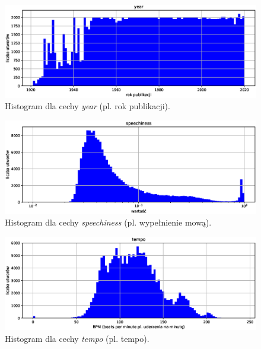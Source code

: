 \documentclass[a4paper,12pt]{article}
\numberwithin{figure}{section}
\begin{document}
    \smallskip

    \begin{figure}[H]
        \centering
        \includegraphics[width=\textwidth]{year}
        \caption{Histogram dla cechy \textit{year} (pl. rok publikacji).}
        \label{fig:year}
    \end{figure}

    \smallskip

    \begin{figure}[H]
        \centering
        \includegraphics[width=\textwidth]{speechiness}
        \caption{Histogram dla cechy \textit{speechiness} (pl. wypełnienie mową).}
        \label{fig:speechiness}
    \end{figure}

    \smallskip

    \begin{figure}[H]
        \centering
        \includegraphics[width=\textwidth]{tempo}
        \caption{Histogram dla cechy \textit{tempo} (pl. tempo).}
        \label{fig:tempo}
    \end{figure}
\end{document}
